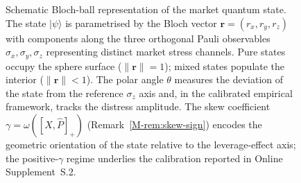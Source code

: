 \begin{figure}[htbp]
\caption{Schematic Bloch-ball representation of the market quantum state.
The state $|\psi\rangle$ is parametrised by the Bloch vector
$\mathbf{r} = (r_x, r_y, r_z)$ with components along the three orthogonal
Pauli observables $\sigma_x, \sigma_y, \sigma_z$ representing distinct
market stress channels. Pure states occupy the sphere surface
($\|\mathbf{r}\|=1$); mixed states populate the interior
($\|\mathbf{r}\|<1$). The polar angle $\theta$ measures the deviation of
the state from the reference $\sigma_z$ axis and, in the calibrated
empirical framework, tracks the distress amplitude. The skew coefficient
$\gamma = \omega([\hat X,\hat P]_+)$
(Remark~\ref{M-rem:skew-sign}) encodes the geometric orientation of the state
relative to the leverage-effect axis; the positive-$\gamma$ regime
underlies the calibration reported in Online Supplement~S.2.}
\label{fig:bloch-ball}
\end{figure}
